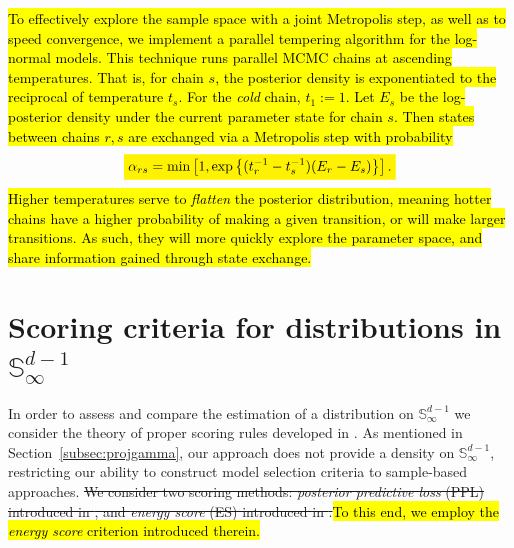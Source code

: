 \documentclass[iicol,sn-basic]{sn-jnl}
\newcommand{\mathcolorbox}[2]{\colorbox{#1}{$\displaystyle #2$}}
\theoremstyle{thmstyleone}
\begin{document}
\hl{To effectively explore the sample space with a joint Metropolis step, as well as to speed convergence, we implement a parallel tempering algorithm\mbox{\citep{earl2005}} for the log-normal models. This technique runs parallel MCMC chains at ascending temperatures. That is, for chain $s$, the posterior density is exponentiated to the reciprocal of temperature $t_s$.  For the \emph{cold} chain, $t_1 := 1$.  Let $E_s$ be the log-posterior density under the current parameter state for chain $s$.  Then states between chains $r,s$ are exchanged via a Metropolis step with probability}
\[
\mathcolorbox{yellow}{\alpha_{rs} = \min\left[1, \exp\left\lbrace(t_{r}^{-1} - t_{s}^{-1})(E_r - E_s)\right\rbrace\right].}
\]
\hl{Higher temperatures serve to \emph{flatten} the posterior distribution, meaning hotter chains have a higher probability of making a given transition, or will make larger transitions.  As such, they will more quickly explore the parameter space, and share information gained through state exchange.}

\section{Scoring criteria for distributions in ${\mathbb S}_\infty^{d-1}$\label{sec:evaluation}}
In order to assess and compare the estimation of a distribution on ${\mathbb S}_\infty^{d-1}$ we consider the theory of proper scoring rules developed in \cite{gneiting2007}. As mentioned in Section~\ref{subsec:projgamma}, our approach does not provide a density on ${\mathbb S}_{\infty}^{d-1}$, restricting our ability to construct model selection criteria to sample-based approaches.  \st{We consider two scoring methods:  \emph{posterior predictive loss} (PPL) introduced in \mbox{\cite{gelfand1998}}, and \emph{energy score} (ES) introduced in \mbox{\cite{gneiting2007}}.}\hl{To this end, we employ the \emph{energy score} criterion introduced therein.}
\end{document}
